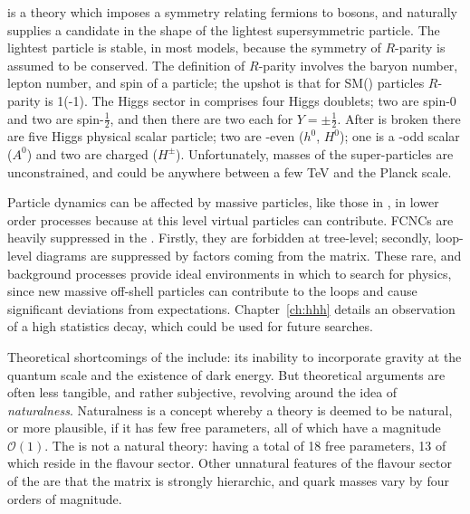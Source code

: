 \SUSY is a theory which imposes a symmetry relating fermions to bosons, and naturally supplies a
\dm candidate in the shape of the lightest supersymmetric
particle.
The lightest \SUSY particle is stable, in most models, because the symmetry of $R$-parity
is assumed to be conserved.
The definition of $R$-parity involves the baryon number, lepton number, and spin of a particle;
the upshot is that for SM(\SUSY) particles $R$-parity is 1(-1).
The Higgs sector in \SUSY comprises four Higgs doublets; two are spin-0 and two are spin-$\tfrac12$,
and then there are two each for $Y=\pm\tfrac12$.
After \SUSY is broken there are five Higgs physical scalar particle; two are \CP-even ($h^0$,
$H^0$); one is a \CP-odd scalar ($A^0$) and two are charged ($H^\pm$).
Unfortunately, masses of the super-particles are unconstrained, and could be anywhere between a few
TeV and the Planck scale.


Particle dynamics can be affected by massive \np particles, like those in \SUSY, in lower order
processes because at this level virtual particles can contribute.
\glspl{FCNC} are heavily suppressed in the \sm.
Firstly, they are forbidden at tree-level; secondly, loop-level diagrams are suppressed by factors
coming from the \ckm matrix.
These rare, and  background processes provide ideal environments in which to search for \bsm
physics, since new massive off-shell particles can contribute to the loops and cause significant
deviations from \sm expectations.
Chapter~\ref{ch:hhh} details an observation of a high statistics \fcnc decay,
which could be used for future \np searches.



Theoretical shortcomings of the \sm include: its inability to incorporate gravity at the quantum
scale and the existence of dark energy.
But theoretical arguments are often less tangible, and
rather subjective, revolving around the idea of \emph{naturalness}.
Naturalness is a concept whereby a theory is deemed to be natural, or more plausible, if it has few
free parameters, all of which have a magnitude $\mathcal{O}(1)$.
The \sm is not a natural theory: having
a total of 18 free parameters, 13 of which reside in the flavour
sector.
Other unnatural features of the flavour sector of the \sm are that the \ckm matrix is strongly
hierarchic, and quark masses vary by four orders of magnitude.


